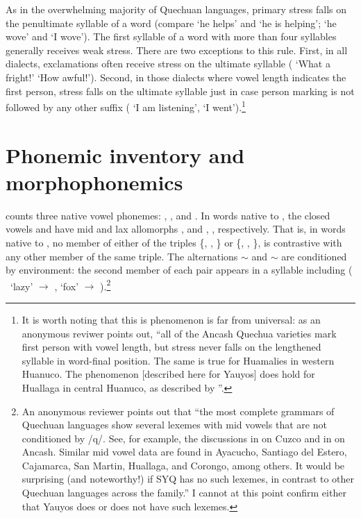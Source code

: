 As in the overwhelming majority of Quechuan languages, primary stress falls on the penultimate syllable of a word (compare  `he helps' and  `he is helping';  `he wove' and  `I wove'). The first syllable of a word with more than four syllables generally receives weak stress. There are two exceptions to this rule. First, in all dialects, exclamations often receive stress on the ultimate syllable ( `What a fright!'  `How awful!'). Second, in those dialects where vowel length indicates the first person, stress falls on the ultimate syllable just in case person marking is not followed by any other suffix ( `I am listening',  `I went').\footnote{It is worth noting that this is phenomenon is far from universal: as an anonymous reviwer points out, ``all of the Ancash Quechua varieties mark first person with vowel length, but stress never falls on the lengthened syllable in word-final position. The same is true for Huamalies in western Huanuco. The phenomenon [described here for Yauyos] does hold for Huallaga in central Huanuco, as described by \citet{Weber89}''.}

\section{Phonemic inventory and morphophonemics}\label{sec:phoinvmor}
\SYQ{} counts three native vowel phonemes: , , and . In words native to \SYQ{}, the closed vowels  and  have mid and lax allomorphs \textipa{[e]}, \textipa{[\textsci]} and \textipa{[o]}, \textipa{[\textupsilon]}, respectively. That is, in words native to \SYQ{}, no member of either of the triples \{\textipa{[i]}, \textipa{[e]}, \textipa{[\textsci]}\} or \{\textipa{[u]}, \textipa{[o]}, \textipa{[\textupsilon]}\}, is contrastive with any other member of the same triple. The alternations \textipa{[i]} $\sim$ \textipa{[e]} and \textipa{[u]} $\sim$ \textipa{[o]} are conditioned by environment: the second member of each pair appears in a syllable including  ( \ `lazy{'} $\rightarrow $ \textipa{[qe\textlambda{}a]},  `fox{'} $\rightarrow $ \textipa{[atoq]}).\footnote{An anonymous reviewer points out that ``the most complete grammars of Quechuan languages show several lexemes with mid vowels that are not conditioned by /q/. See, for example, the discussions in \citet[46--51]{Cusihuaman76} on Cuzco and in \citet[xiv--xv]{swisshelm1972} on Ancash. Similar mid vowel data are found in Ayacucho, Santiago del Estero, Cajamarca, San Martin, Huallaga, and Corongo, among others. It would be surprising (and noteworthy!) if SYQ has no such lexemes, in contrast to other Quechuan languages across the family.'' I cannot at this point confirm either that Yauyos does or does not have such lexemes.}


